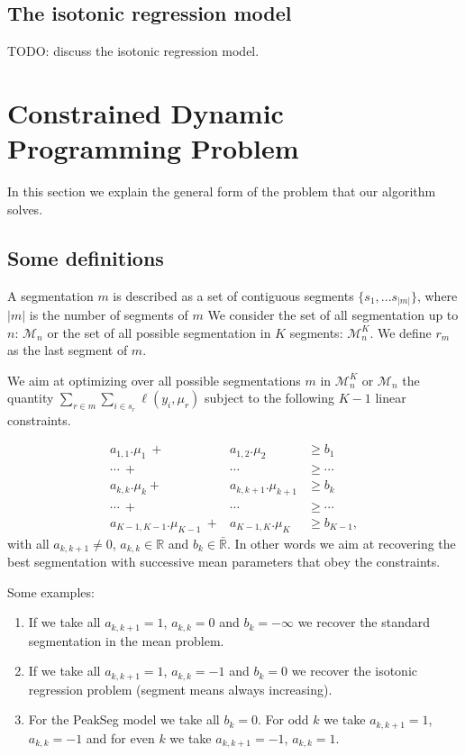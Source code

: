 \documentclass{article}
\begin{document}
\subsection{The isotonic regression model}

TODO: discuss the isotonic regression model.

\newcommand{\FCC}{\widetilde{C}}
\newcommand{\M}{\mathcal{M}}
\section{Constrained Dynamic Programming Problem}

In this section we explain the general form of the problem that our algorithm solves.

\subsection{Some definitions}

A segmentation $m$ is described as a set of contiguous segments $\{s_1, ... s_{|m|} \}$, where $|m|$ is the number of segments of $m$
We consider the set of all segmentation up to $n$: $\M_n$ 
or the set of all possible segmentation in $K$ segments: $\M^K_n$.
We define $r_m$ as the last segment of $m$.

We aim at optimizing over all possible segmentations $m$ in $\M^K_n$ or $\M_n$
 the quantity
$\sum_{r \in m} \sum_{i \in s_{r}} \ell(y_i, \mu_{r})$ subject to
the following $K-1$ linear constraints. 

\begin{eqnarray*}
a_{1,1}.\mu_1 \ + & a_{1,2}.\mu_2  & \geq  b_1 \\
\cdots \ +&  \cdots & \geq \cdots \\
a_{k,k}.\mu_{k} + & a_{k,k+1}.\mu_{k+1}  & \geq  b_{k} \\
\cdots \ +&  \cdots & \geq \cdots  \\
a_{K-1,K-1}.\mu_{K-1} \ +& a_{K-1,K}.\mu_K & \geq  b_{K-1},
\end{eqnarray*}
with all $a_{k,k+1} \neq 0$, $a_{k,k} \in \mathbb{R}$ and
$b_{k} \in \bar{\mathbb{R}}.$ In other words we aim at recovering the
best segmentation with successive mean parameters that obey the
constraints.

Some examples:
\begin{enumerate}
\item If we take all $a_{k,k+1} =1$, $a_{k,k}=0$ and $b_{k} = - \infty$ we recover the standard segmentation in the mean problem.
\item If we take all $a_{k,k+1} =1$, $a_{k,k}=-1$ and $b_{k} = 0$ we
  recover the isotonic regression problem (segment means always
  increasing).
\item For the PeakSeg model we take all $b_{k} = 0$. For odd $k$ we
  take $a_{k,k+1} =1$, $a_{k,k}=-1$ and for even $k$ we take
  $a_{k,k+1} =-1$, $a_{k,k}=1$.
\end{enumerate}
\end{document}
